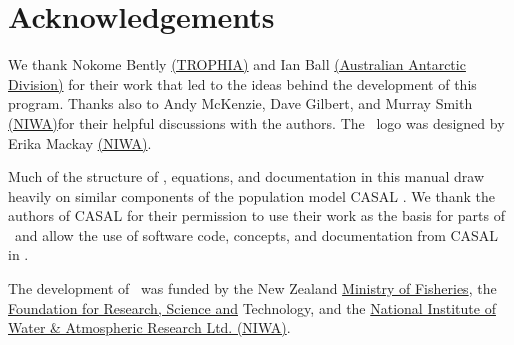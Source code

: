 \section{Acknowledgements\label{sec:acknowledgements}}

We thank Nokome Bently \href{http://www.trophia.co.nz}{(TROPHIA)} and Ian Ball \href{http://www.aad.gov.au}{(Australian Antarctic Division)} for their work that led to the ideas behind the development of this program. Thanks also to Andy McKenzie, Dave Gilbert, and Murray Smith \href{http://www.niwa.co.nz}{(NIWA)}for their helpful discussions with the authors. The \SPM\ logo was designed by Erika Mackay \href{http://www.niwa.co.nz}{(NIWA)}. 

Much of the structure of \SPM, equations, and documentation in this manual draw heavily on similar components of the population model CASAL \citep{1388}. We thank the authors of CASAL for their permission to use their work as the basis for parts of \SPM\ and allow the use of software code, concepts, and documentation from CASAL in \SPM.

The development of \SPM\ was funded by the New Zealand \href{http://www.fish.govt.nz}{Ministry of Fisheries}, the \href{http://www.frst.govt.nz}{Foundation for Research, Science and} Technology, and the \href{http://www.niwa.co.nz}{National Institute of Water \& Atmospheric Research Ltd. (NIWA)}. 
